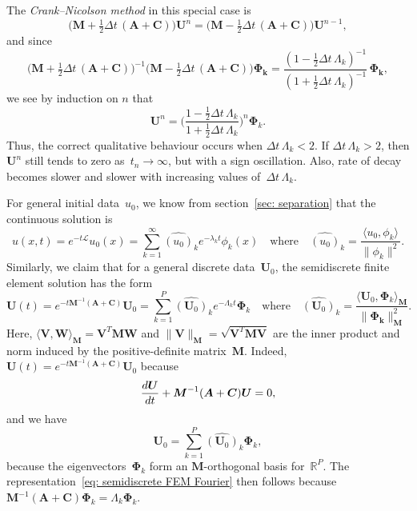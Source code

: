 \begin{example}
The \emph{Crank--Nicolson method} in this special case is
\[
\bigl(\boldsymbol{M}+\tfrac12\Delta t\,(\boldsymbol{A}+\boldsymbol{C})\bigr) 
    \boldsymbol{U}^n
=\bigl(\boldsymbol{M}-\tfrac12\Delta t\,(\boldsymbol{A}+\boldsymbol{C})\bigr) 
    \boldsymbol{U}^{n-1},
\]
and since
\[
\bigl(\boldsymbol{M}+\tfrac12\Delta t\,
    (\boldsymbol{A}+\boldsymbol{C})\bigr)^{-1}
\bigl(\boldsymbol{M}-\tfrac12\Delta t\,(\boldsymbol{A}+\boldsymbol{C})\bigr) 
    \boldsymbol{\Phi_k}
    =\frac{(1-\tfrac12\Delta t\,\Lambda_k)^{-1}}%
{(1+\tfrac12\Delta t\,\Lambda_k)^{-1}}\,\boldsymbol{\Phi_k},
\]
we see by induction on $n$ that
\[
\boldsymbol{U}^n=\biggl(
    \frac{1-\tfrac12\Delta t\,\Lambda_k}{1+\tfrac12\Delta t\,\Lambda_k}\biggr)^n
    \boldsymbol{\Phi}_k.
\]
Thus, the correct qualitative behaviour occurs when $\Delta t\,\Lambda_k<2$.
If $\Delta t\,\Lambda_k>2$, then $\boldsymbol{U}^n$ still tends to zero 
as~$t_n\to\infty$, but with a sign oscillation.  Also, rate of decay becomes 
slower and slower with increasing values of~$\Delta t\,\Lambda_k$.
\end{example}

For general initial data~$u_0$, we know from section~\ref{sec: separation} 
that the continuous solution is
\[
u(x,t)=e^{-t\mathcal{L}}u_0(x)
    =\sum_{k=1}^\infty\widehat{(u_0)}_k e^{-\lambda_kt}\phi_k(x)
\quad\text{where}\quad
\widehat{(u_0)}_k=\frac{\langle u_0,\phi_k\rangle}{\|\phi_k\|^2}.
\]
Similarly, we claim that for a general discrete
data~$\boldsymbol{U}_0$, the semidiscrete finite element solution has the form
\begin{equation}\label{eq: semidiscrete FEM Fourier}
\boldsymbol{U}(t)=e^{-t\boldsymbol{M}^{-1}(\boldsymbol{A}+\boldsymbol{C})}
    \boldsymbol{U}_0
    =\sum_{k=1}^P\widehat{(\boldsymbol{U}_0)}_k e^{-\Lambda_kt}
    \boldsymbol{\Phi}_k
\quad\text{where}\quad
\widehat{(\boldsymbol{U}_0)}_k
=\frac{\langle\boldsymbol{U}_0,\boldsymbol{\Phi}_k\rangle_{\boldsymbol{M}}}%
{\|\boldsymbol{\Phi_k}\|_{\boldsymbol{M}}^2}.
\end{equation}
Here, $\langle\boldsymbol{V},\boldsymbol{W}\rangle_{\boldsymbol{M}}
=\boldsymbol{V}^T\boldsymbol{M}\boldsymbol{W}$ and 
$\|\boldsymbol{V}\|_{\boldsymbol{M}}
=\sqrt{\boldsymbol{V}^T\boldsymbol{M}\boldsymbol{V}}$ are the inner product and 
norm induced by the positive-definite matrix~$\boldsymbol{M}$.  Indeed, 
$\boldsymbol{U}(t)=e^{-t\boldsymbol{M}^{-1}(\boldsymbol{A}+\boldsymbol{C})}
\boldsymbol{U}_0$ because
\[
\frac{d\boldsymbol{U}}{dt}+\boldsymbol{M}^{-1}(\boldsymbol{A}+\boldsymbol{C})
\boldsymbol{U}=\boldmath{0},
\]
and we have
\[
\boldsymbol{U}_0=\sum_{k=1}^P\widehat{(\boldsymbol{U}_0)}_k\boldsymbol{\Phi}_k,
\]
because the eigenvectors~$\boldsymbol{\Phi}_k$ form an 
$\boldsymbol{M}$-orthogonal basis for~$\mathbb{R}^P$.  The 
representation~\eqref{eq: semidiscrete FEM Fourier} then follows because
$\boldsymbol{M}^{-1}(\boldsymbol{A}+\boldsymbol{C})\boldsymbol{\Phi}_k
=\Lambda_k\boldsymbol{\Phi}_k$.


